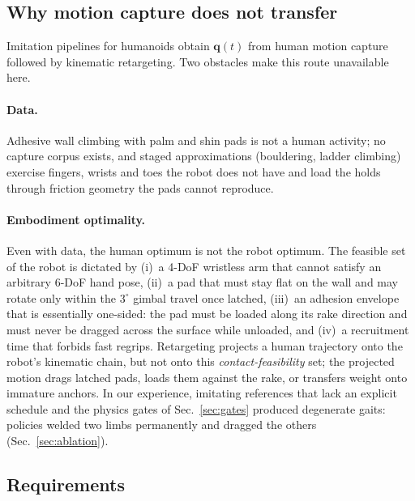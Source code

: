\documentclass[11pt]{article}
\begin{document}
\subsection{Why motion capture does not transfer}

Imitation pipelines for humanoids obtain $\bm q(t)$ from human motion
capture followed by kinematic retargeting. Two obstacles make this route
unavailable here.

\paragraph{Data.} Adhesive wall climbing with palm and shin pads is not a
human activity; no capture corpus exists, and staged approximations
(bouldering, ladder climbing) exercise fingers, wrists and toes the robot
does not have and load the holds through friction geometry the pads cannot
reproduce.

\paragraph{Embodiment optimality.} Even with data, the human optimum is not
the robot optimum. The feasible set of the robot is dictated by (i)~a
4-DoF wristless arm that cannot satisfy an arbitrary 6-DoF hand pose,
(ii)~a pad that must stay flat on the wall and may rotate only within the
$3^\circ$ gimbal travel once latched, (iii)~an adhesion envelope that is
essentially one-sided: the pad must be loaded along its rake direction and
must never be dragged across the surface while unloaded, and (iv)~a
recruitment time that forbids fast regrips. Retargeting projects a human
trajectory onto the robot's kinematic chain, but not onto this
\emph{contact-feasibility} set; the projected motion drags latched pads,
loads them against the rake, or transfers weight onto immature anchors.
In our experience, imitating references that lack an explicit schedule and
the physics gates of Sec.~\ref{sec:gates} produced degenerate gaits: policies
welded two limbs permanently and dragged the others (Sec.~\ref{sec:ablation}).

\subsection{Requirements}
\end{document}
